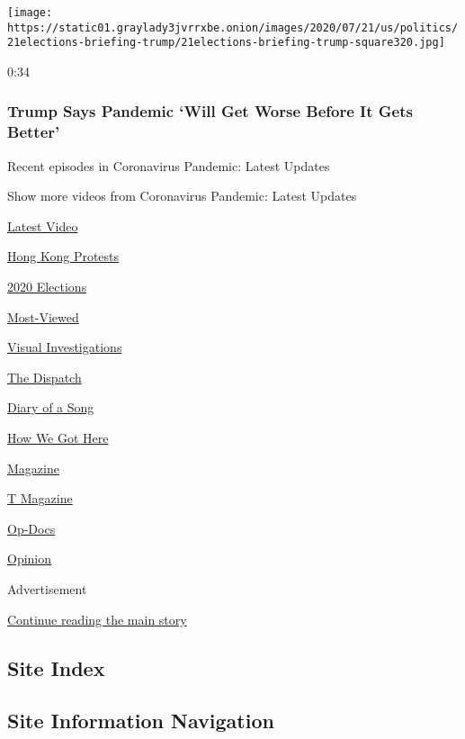 \begin{itemize}
  \texttt{[image: https://static01.graylady3jvrrxbe.onion/images/2020/07/21/us/politics/21elections-briefing-trump/21elections-briefing-trump-square320.jpg]}

  0:34

  \hypertarget{trump-says-pandemic-will-get-worse-before-it-gets-better}{%
  \subsubsection{Trump Says Pandemic `Will Get Worse Before It Gets
  Better'}\label{trump-says-pandemic-will-get-worse-before-it-gets-better}}
\end{itemize}

Recent episodes in Coronavirus Pandemic: Latest Updates

Show more videos from Coronavirus Pandemic: Latest Updates

\href{/video}{}

\href{/video/latest-video}{Latest Video}

\href{/video/hk-protest}{Hong Kong Protests}

\href{/video/2020-Elections}{2020 Elections}

\href{/video/Most-Viewed}{Most-Viewed}

\href{/video/investigations}{Visual Investigations}

\href{/video/on-the-ground}{The Dispatch}

\href{/video/diaryofasong}{Diary of a Song}

\href{/video/how-we-got-here}{How We Got Here}

\href{/video/magazine}{Magazine}

\href{/video/t-magazine}{T Magazine}

\href{/video/op-docs}{Op-Docs}

\href{/video/opinion}{Opinion}

Advertisement

\protect\hyperlink{after-bottom}{Continue reading the main story}

\hypertarget{site-index}{%
\subsection{Site Index}\label{site-index}}

\hypertarget{site-information-navigation}{%
\subsection{Site Information
Navigation}\label{site-information-navigation}}

